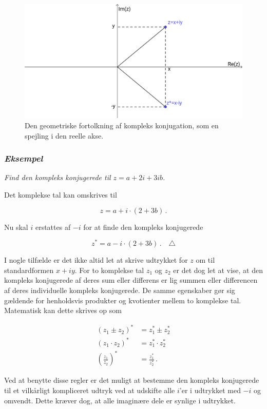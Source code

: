 \documentclass[a4paper, 12pt,titlepage]{article}
\begin{document}
\begin{figure}[htbp]
\centering
\includegraphics[width=.9\linewidth]{./img/konjugation.png}
\caption{\label{fig:konjugation}Den geometriske fortolkning af kompleks konjugation, som en spejling i den reelle akse.}
\end{figure}

\subsubsection*{\emph{Eksempel}}
\label{sec:orga92199f}
\emph{Find den kompleks konjugerede til \(z=a+2i+3ib\).}

Det komplekse tal kan omskrives til

$$z= a +i\cdot(2+3b) \,.$$

Nu skal \(i\) erstattes af \(-i\) for at finde den kompleks konjugerede

$$z^*= a -i\cdot(2+3b) \,.\quad \triangle$$

I nogle tilfælde er det ikke altid let at skrive udtrykket for \(z\) om til standardformen \(x+iy\). For to komplekse tal \(z_1\) og \(z_2\) er det dog let at vise, at den kompleks konjugerede af deres sum eller differens er lig summen eller differencen af deres individuelle kompleks konjugerede. De samme egenskaber gør sig gældende for henholdsvis produkter og kvotienter mellem to komplekse tal. Matematisk kan dette skrives op som

\begin{align*}
    (z_1 \pm z_2)^* &= z_1^* \pm z_2^* \\
    (z_1 \cdot z_2)^* &= z_1^* \cdot z_2^* \\
    \left(\frac{z_1}{z_2}\right)^* &= \frac{z_1^*}{z_2^*} \,.
\end{align*}

Ved at benytte disse regler er det muligt at bestemme den kompleks konjugerede til et vilkårligt kompliceret udtryk ved at udskifte alle \(i\)'er i udtrykket med \(-i\) og omvendt. Dette kræver dog, at alle imaginære dele er synlige i udtrykket.
\end{document}
